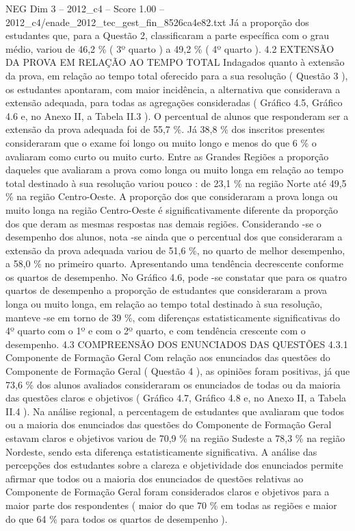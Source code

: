 \begin{textsample}{NEG Dim 3 – 2012\_c4 – Score 1.00 – 2012\_c4/enade\_2012\_tec\_gest\_fin\_8526ca4e82.txt}
Já a proporção dos estudantes que, para a Questão 2, classificaram a parte específica com o grau médio, variou de 46,2 \% ( 3º quarto ) a 49,2 \% ( 4º quarto ). 4.2 EXTENSÃO DA PROVA EM RELAÇÃO AO TEMPO TOTAL Indagados quanto à extensão da prova, em relação ao tempo total oferecido para a sua resolução ( Questão 3 ), os estudantes apontaram, com maior incidência, a alternativa que considerava a extensão adequada, para todas as agregações consideradas ( Gráfico 4.5, Gráfico 4.6 e, no Anexo II, a Tabela II.3 ).
O percentual de alunos que responderam ser a extensão da prova adequada foi de 55,7 \%.
Já 38,8 \% dos inscritos presentes consideraram que o exame foi longo ou muito longo e menos do que 6 \% o avaliaram como curto ou muito curto.
Entre as Grandes Regiões a proporção daqueles que avaliaram a prova como longa ou muito longa em relação ao tempo total destinado à sua resolução variou pouco : de 23,1 \% na região Norte até 49,5 \% na região Centro-Oeste.
A proporção dos que consideraram a prova longa ou muito longa na região Centro-Oeste é significativamente diferente da proporção dos que deram as mesmas respostas nas demais regiões.
Considerando -se o desempenho dos alunos, nota -se ainda que o percentual dos que consideraram a extensão da prova adequada variou de 51,6 \%, no quarto de melhor desempenho, a 58,0 \% no primeiro quarto.
Apresentando uma tendência decrescente conforme os quartos de desempenho.
No Gráfico 4.6, pode -se constatar que para os quatro quartos de desempenho a proporção de estudantes que consideraram a prova longa ou muito longa, em relação ao tempo total destinado à sua resolução, manteve -se em torno de 39 \%, com diferenças estatisticamente significativas do 4º quarto com o 1º e com o 2º quarto, e com tendência crescente com o desempenho. 4.3 COMPREENSÃO DOS ENUNCIADOS DAS QUESTÕES 4.3.1 Componente de Formação Geral Com relação aos enunciados das questões do Componente de Formação Geral ( Questão 4 ), as opiniões foram positivas, já que 73,6 \% dos alunos avaliados consideraram os enunciados de todas ou da maioria das questões claros e objetivos ( Gráfico 4.7, Gráfico 4.8 e, no Anexo II, a Tabela II.4 ).
Na análise regional, a percentagem de estudantes que avaliaram que todos ou a maioria dos enunciados das questões do Componente de Formação Geral estavam claros e objetivos variou de 70,9 \% na região Sudeste a 78,3 \% na região Nordeste, sendo esta diferença estatisticamente significativa.
A análise das percepções dos estudantes sobre a clareza e objetividade dos enunciados permite afirmar que todos ou a maioria dos enunciados de questões relativas ao Componente de Formação Geral foram considerados claros e objetivos para a maior parte dos respondentes ( maior do que 70 \% em todas as regiões e maior do que 64 \% para todos os quartos de desempenho ).

\end{textsample}
